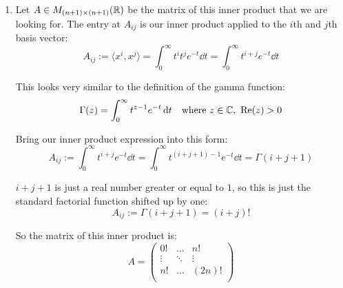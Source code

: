 \documentclass[12pt]{article}
\begin{document}
\begin{enumerate}[label=\alph*)]
\begin{enumerate}[label=\arabic*.]
        Let $\alpha \in \R,\ p, q \in \R[x]_{\leq n}$. Then
        $$
            \langle p, \alpha q \rangle = \langle \alpha q, p \rangle = \alpha \langle q, p \rangle = \alpha \langle p, q \rangle
        $$

        So we have linearity in the second variable.

        \item \textbf{Positivity}: Let $p \in \R[x]_{\leq n}$. We have
        $$
            \langle p, p \rangle = \int_{0}^{\infty} p(t)p(t)e^{-t}\dd t = \int_{0}^{\infty} p(t)^2e^{-t}\dd t
        $$

        Note that $p(t)^2 \geq 0 \text{ and } e^{-t} > 0\ \forall t \in [0, \infty)$. Assume $p \not\equiv 0$. Because $p(t)$ is a non-zero polynomial of degree less than or equal to $n$, we know that $p(t)$ has at most $n$ roots. Therefore, $p(t)^2e^{-t}$ is a continuous, non-negative function that is strictly positive except for at finitely many points (its roots). The Riemann integral of such a function over $[0, \infty)$ must be strictly positive. Therefore, $\langle p, p \rangle > 0$.
        
    \end{enumerate}

    \item Let $A \in M_{(n+1) \times (n+1)}(\mathbb{R})$ be the matrix of this inner product that we are looking for. The entry at $A_{ij}$ is our inner product applied to the $i$th and $j$th basis vector:
    $$
        A_{ij} := \langle x^i, x^j \rangle = \int_{0}^{\infty} t^i t^j e^{-t}\dd t = \int_{0}^{\infty} t^{i + j} e^{-t}\dd t
    $$

    This looks very similar to the definition of the gamma function:
    $$
        \Gamma(z) = \int_{0}^{\infty} t^{z - 1} e^{-t}\mathop{}\!\mathrm{d} t \quad \text{where } z \in \mathbb{C},\ \mathrm{Re}(z) > 0
    $$

    Bring our inner product expression into this form:
    $$
        A_{ij} := \int_{0}^{\infty} t^{i + j} e^{-t}\dd t = \int_{0}^{\infty} t^{(i + j + 1) - 1} e^{-t}\dd t = \Gamma(i + j + 1)
    $$

    $i + j + 1$ is just a real number greater or equal to $1$, so this is just the standard factorial function shifted up by one:
    $$
        A_{ij} := \Gamma(i + j + 1) = (i + j)!
    $$

    So the matrix of this inner product is:
    $$
        A = \begin{pmatrix}
            0! & \dots & n! \\
            \vdots & \ddots & \vdots \\
            n! & \dots & (2n)! \\
        \end{pmatrix}
    $$
\end{enumerate}
\end{document}
